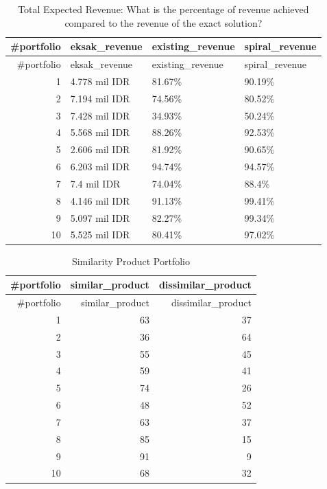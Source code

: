 \documentclass[
]{article}
\begin{document}
\newpage

\begin{longtable}[]{@{}rlll@{}}
\caption{Total Expected Revenue: What is the percentage of revenue
achieved compared to the revenue of the exact solution?}\tabularnewline
\toprule()
\#portfolio & eksak\_revenue & existing\_revenue & spiral\_revenue \\
\midrule()
\endfirsthead
\toprule()
\#portfolio & eksak\_revenue & existing\_revenue & spiral\_revenue \\
\midrule()
\endhead
1 & 4.778 mil IDR & 81.67\% & 90.19\% \\
2 & 7.194 mil IDR & 74.56\% & 80.52\% \\
3 & 7.428 mil IDR & 34.93\% & 50.24\% \\
4 & 5.568 mil IDR & 88.26\% & 92.53\% \\
5 & 2.606 mil IDR & 81.92\% & 90.65\% \\
6 & 6.203 mil IDR & 94.74\% & 94.57\% \\
7 & 7.4 mil IDR & 74.04\% & 88.4\% \\
8 & 4.146 mil IDR & 91.13\% & 99.41\% \\
9 & 5.097 mil IDR & 82.27\% & 99.34\% \\
10 & 5.525 mil IDR & 80.41\% & 97.02\% \\
\bottomrule()
\end{longtable}

\newpage

\begin{longtable}[]{@{}rrr@{}}
\caption{Similarity Product Portfolio}\tabularnewline
\toprule()
\#portfolio & similar\_product & dissimilar\_product \\
\midrule()
\endfirsthead
\toprule()
\#portfolio & similar\_product & dissimilar\_product \\
\midrule()
\endhead
1 & 63 & 37 \\
2 & 36 & 64 \\
3 & 55 & 45 \\
4 & 59 & 41 \\
5 & 74 & 26 \\
6 & 48 & 52 \\
7 & 63 & 37 \\
8 & 85 & 15 \\
9 & 91 & 9 \\
10 & 68 & 32 \\
\bottomrule()
\end{longtable}

\newpage
\end{document}
